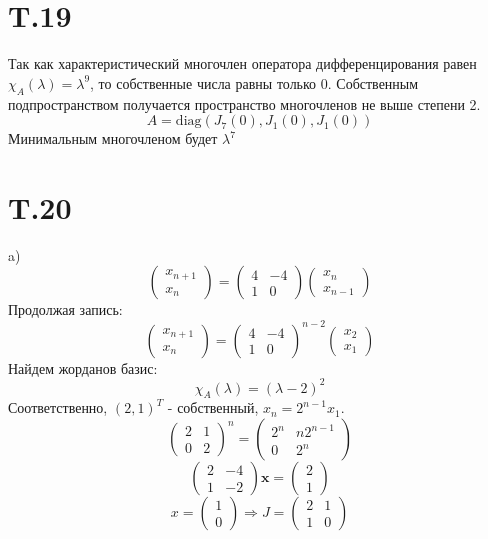\documentclass[a4paper,12pt]{article} %
\begin{document}
\section*{T.19} Так как характеристический многочлен оператора дифференцирования равен $\chi_A(\lambda)=\lambda^9$, то собственные числа равны только 0. Собственным подпространством получается пространство многочленов не выше степени 2.
$$A=\mathrm{diag}(J_{7}(0),J_{1}(0),J_{1}(0))$$
Минимальным многочленом будет $\lambda^7$
\section*{T.20}
a) $$\begin{pmatrix*}
    x_{n+1}\\
    x_{n}
\end{pmatrix*}=\begin{pmatrix*}
    4&-4\\
    1&0
\end{pmatrix*}\begin{pmatrix*}
    x_{n}\\
    x_{n-1}
\end{pmatrix*}$$
Продолжая запись:
$$\begin{pmatrix*}
    x_{n+1}\\
    x_{n}
\end{pmatrix*}=\begin{pmatrix*}
    4&-4\\
    1&0
\end{pmatrix*}^{n-2}\begin{pmatrix*}
    x_{2}\\
    x_{1}
\end{pmatrix*}$$
Найдем жорданов базис:
$$\chi_A(\lambda)=(\lambda-2)^2$$
Соответственно, $(2,1)^{T}$ - собственный, $x_n=2^{n-1}x_1$.
$$\begin{pmatrix*}
    2&1\\
    0&2
\end{pmatrix*}^{n}=\begin{pmatrix*}
    2^n&n2^{n-1}\\
    0&2^n
\end{pmatrix*}$$
$$\begin{pmatrix*}
    2&-4\\
    1&-2
\end{pmatrix*}\textbf{x}=\begin{pmatrix*}
    2\\
    1
\end{pmatrix*}$$
$$x=\begin{pmatrix*}
    1\\0
\end{pmatrix*}\Rightarrow J=\begin{pmatrix*}
    2&1\\
    1&0
\end{pmatrix*}$$
\end{document}
